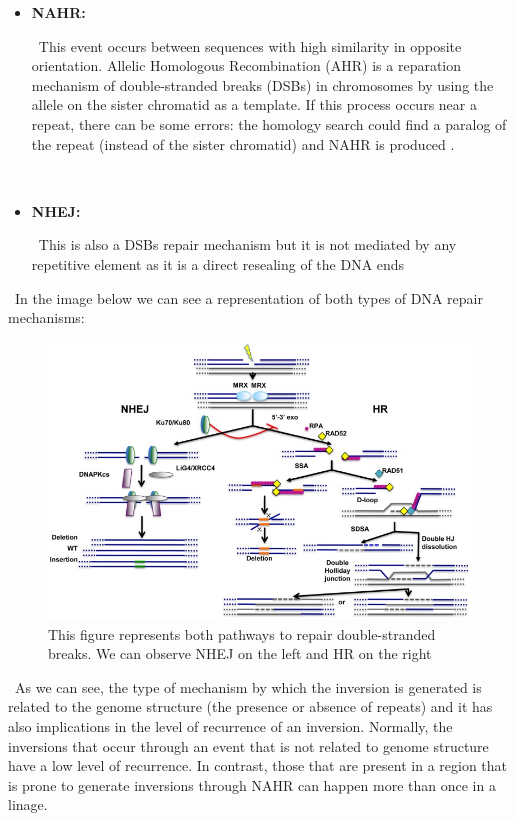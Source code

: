 \documentclass[a4paper,12pt]{article}
\begin{document}
\begin{itemize}
    \item {\bf NAHR:} 
    
    \
    This event occurs between sequences with high similarity in opposite orientation. Allelic Homologous Recombination (AHR) is a reparation mechanism of  double-stranded breaks (DSBs) in chromosomes by using the allele on the sister chromatid as a template. If this process occurs near a repeat, there can be some errors: the homology search could find a paralog of the repeat (instead of the sister chromatid) and NAHR is produced \cite{parks_detecting_2015}.
    
    \
    \item{\bf NHEJ:}
    
    \
    This is also a DSBs repair mechanism but it is not mediated by any repetitive element as it is a direct resealing of the DNA ends \cite{decottignies_alternative_2013}
\end{itemize}

\
In the image below we can see a representation of both types of DNA repair mechanisms:
\begin{figure}[!htb]
    \centering
    \includegraphics[width=1\linewidth]{figures/mechanisms.jpg}
    \caption{This figure \cite{decottignies_alternative_2013} represents both pathways to repair double-stranded breaks. We can observe NHEJ on the left and HR on the right}
    \label{fig:pathways}
\end{figure}

\
As we can see, the type of mechanism by which the inversion is generated is related to the genome structure (the presence or absence of repeats) and it has also implications in the level of recurrence of an inversion. Normally, the inversions that occur through an event that is not related to genome structure have a low level of recurrence. In contrast, those that are present in a region that is prone to generate inversions through NAHR can happen more than once in a linage.
\end{document}
